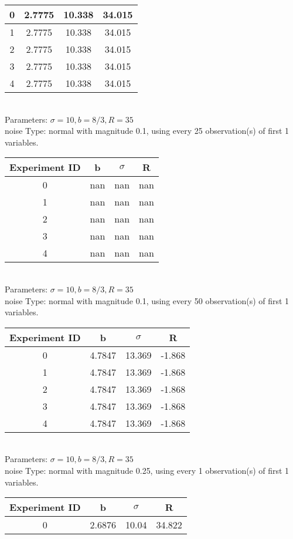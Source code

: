 \begin{multicols}{3}
\begin{tabular}{cccc}
0 & 2.7775 & 10.338 & 34.015\\ \hline 
 1 & 2.7775 & 10.338 & 34.015\\ \hline 
 2 & 2.7775 & 10.338 & 34.015\\ \hline 
 3 & 2.7775 & 10.338 & 34.015\\ \hline 
 4 & 2.7775 & 10.338 & 34.015\\ \hline 
 \end{tabular}\\
Parameters: $\sigma=10, b=8/3, R=35$\\
noise Type: normal with magnitude 0.1, using every 25 observation(s) of first 1 variables.\\
\begin{tabular}{cccc}
\hline Experiment ID & b & $\sigma$ & R \\ \hline 
0 & nan & nan & nan\\ \hline 
 1 & nan & nan & nan\\ \hline 
 2 & nan & nan & nan\\ \hline 
 3 & nan & nan & nan\\ \hline 
 4 & nan & nan & nan\\ \hline 
 \end{tabular}\\
Parameters: $\sigma=10, b=8/3, R=35$\\
noise Type: normal with magnitude 0.1, using every 50 observation(s) of first 1 variables.\\
\begin{tabular}{cccc}
\hline Experiment ID & b & $\sigma$ & R \\ \hline 
0 & 4.7847 & 13.369 & -1.868\\ \hline 
 1 & 4.7847 & 13.369 & -1.868\\ \hline 
 2 & 4.7847 & 13.369 & -1.868\\ \hline 
 3 & 4.7847 & 13.369 & -1.868\\ \hline 
 4 & 4.7847 & 13.369 & -1.868\\ \hline 
 \end{tabular}\\
Parameters: $\sigma=10, b=8/3, R=35$\\
noise Type: normal with magnitude 0.25, using every 1 observation(s) of first 1 variables.\\
\begin{tabular}{cccc}
\hline Experiment ID & b & $\sigma$ & R \\ \hline 
0 & 2.6876 & 10.04 & 34.822\\ \hline 

\end{tabular}
\end{multicols}
